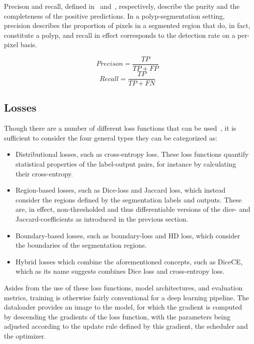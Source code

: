         Precison and recall, defined in~ and~, respectively, describe the purity and the completeness of the positive predictions. In a polyp-segmentation setting, precision describes the proportion of pixels in a segmented region that do, in fact, constitute a polyp, and recall in effect corresponds to the detection rate on a per-pixel basis. 
        
        \begin{equation} \label{precison}
            Precison = \frac{TP}{TP+FP}
        \end{equation}
        \begin{equation} \label{recall}
            Recall = \frac{TP}{TP+FN}
        \end{equation}
        
    \subsection{Losses}
    Though there are a number of different loss functions that can be used~\cite{semantic_segmentation_survey, seglosses}, it is sufficient to consider the four general types they can be categorized as:
    \begin{itemize}
        \item Distributional losses, such as cross-entropy loss. These loss functions quantify statistical properties of the label-output pairs, for instance by calculating their cross-entropy.
        
        \item Region-based losses, such as Dice-loss and Jaccard loss, which instead consider the regions defined by the segmentation labels and outputs. These are, in effect, non-thresholded and thus differentiable versions of the dice- and Jaccard-coefficients as introduced in the previous section.
        
        \item Boundary-based losses, such as boundary-loss and HD loss, which consider the boundaries of the segmentation regions.
        
        \item Hybrid losses which combine the aforementioned concepts, such as DiceCE, which as its name suggests combines Dice loss and cross-entropy loss.
    \end{itemize}
 
Asides from the use of these loss functions, model architectures, and evaluation metrics, training is otherwise fairly conventional for a deep learning pipeline. The dataloader provides an image to the model, for which the gradient is computed by descending the gradients of the loss function, with the parameters being adjusted according to the update rule defined by this gradient, the scheduler and the optimizer. 


